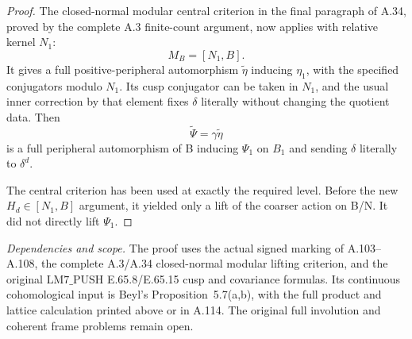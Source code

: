 \begin{proof}
The closed-normal modular central criterion in the final paragraph of A.34, proved by the complete A.3 finite-count argument, now applies with relative kernel \emph{\(N_1\)}:
\[
M_B=[N_1,B].
\]
It gives a full positive-peripheral automorphism \(\widetilde\eta\) inducing \(\eta_1\), with the specified conjugators modulo \(N_1\). Its cusp conjugator can be taken in \(N_1\), and the usual inner correction by that element fixes \(\delta\) literally without changing the quotient data. Then
\[
\widetilde\Psi=\gamma\widetilde\eta
\]
is a full peripheral automorphism of B inducing \(\Psi_1\) on \(B_1\) and sending \(\delta\) literally to \(\delta^d\).

The central criterion has been used at exactly the required level. Before the new \(H_d\in[N_1,B]\) argument, it yielded only a lift of the coarser action on B/N. It did not directly lift \(\Psi_1\).

\end{proof}
\noindent\emph{Dependencies and scope.}
The proof uses the actual signed marking of A.103--A.108,
the complete A.3/A.34 closed-normal modular lifting criterion,
and the original \(\mathrm{LM7\_PUSH}\) E.65.8/E.65.15 cusp and covariance
formulas. Its continuous cohomological input is Beyl's Proposition~5.7(a,b),
with the full product and lattice calculation printed above or in A.114.
The original full involution and coherent frame problems remain open.
